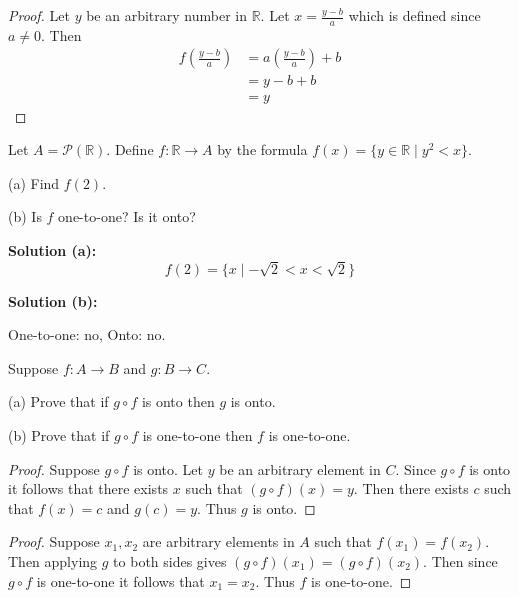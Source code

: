 \begin{proof}
    Let $y$ be an arbitrary number in $\mathbb{R}$.
    Let $x = \frac{y - b}{a}$ which is defined since $a \ne 0$.
    Then 
    \begin{align*}
        f\left(\frac{y - b}{a}\right)
            &= a\left(\frac{y - b}{a}\right) + b \\
            &= y - b + b \\
            &= y
    \end{align*}
\end{proof}

\begin{tcolorbox}[title=Problem 8, breakable]
    Let $A = \mathcal{P}(\mathbb{R})$. 
    Define $f : \mathbb{R} \rightarrow A$
        by the formula $f(x) = \{y \in \mathbb{R} \mid y^2 < x\}$.
    
    (a) Find $f(2)$.

    (b) Is $f$ one-to-one? Is it onto?
\end{tcolorbox}

\textbf{Solution (a):}
\[f(2) = \{x \mid -\sqrt{2} < x < \sqrt{2}\}\]

\textbf{Solution (b):}
\begin{center}
    One-to-one: no, Onto: no.
\end{center}

\begin{tcolorbox}[title=Problem 10, breakable]
    Suppose $f : A \rightarrow B$ and $g : B \rightarrow C$.

    (a) Prove that if $g \circ f$ is onto then $g$ is onto.

    (b) Prove that if $g \circ f$ is one-to-one then $f$ is one-to-one.
\end{tcolorbox}

\begin{proof}
    Suppose $g \circ f$ is onto.
    Let $y$ be an arbitrary element in $C$.
    Since $g \circ f$ is onto it follows that 
        there exists $x$ such that $(g \circ f)(x) = y$.
    Then there exists $c$ such that 
        $f(x) = c$ and $g(c) = y$.
    Thus $g$ is onto.
\end{proof}

\begin{proof}
    Suppose $x_1, x_2$ are arbitrary elements in $A$
        such that $f(x_1) = f(x_2)$.
    Then applying $g$ to both sides gives 
        $(g \circ f)(x_1) = (g \circ f)(x_2)$. 
    Then since $g \circ f$ is one-to-one it follows that 
        $x_1 = x_2$.
    Thus $f$ is one-to-one.
\end{proof}

